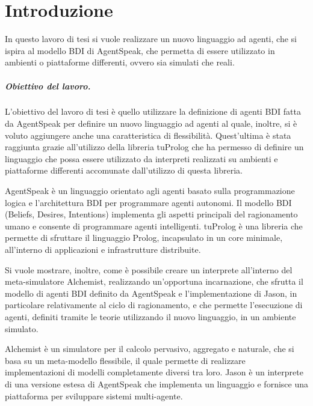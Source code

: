 \chapter{Introduzione}
\lhead[\fancyplain{}{\bfseries\thepage}]{\fancyplain{}{\bfseries\rightmark}}
In questo lavoro di tesi si vuole realizzare un nuovo linguaggio ad agenti, che si ispira al modello BDI di AgentSpeak, che permetta di essere utilizzato in ambienti o piattaforme differenti, ovvero sia simulati che reali.

\paragraph{Obiettivo del lavoro.}
L'obiettivo del lavoro di tesi è quello utilizzare la definizione di agenti BDI fatta da AgentSpeak per definire un nuovo linguaggio ad agenti al quale, inoltre, si è voluto aggiungere anche una caratteristica di flessibilità. Quest'ultima è stata raggiunta grazie all'utilizzo della libreria tuProlog che ha permesso di definire un linguaggio che possa essere utilizzato da interpreti realizzati su ambienti e piattaforme differenti accomunate dall'utilizzo di questa libreria.

AgentSpeak è un linguaggio orientato agli agenti basato sulla programmazione logica e l'architettura BDI per programmare agenti autonomi. Il modello BDI (Beliefs, Desires, Intentions) implementa gli aspetti principali del ragionamento umano e consente di programmare agenti intelligenti.
tuProlog è una libreria che permette di sfruttare il linguaggio Prolog, incapsulato in un core minimale, all'interno di applicazioni e infrastrutture distribuite.

Si vuole mostrare, inoltre, come è possibile creare un interprete all'interno del meta-simulatore Alchemist, realizzando un'opportuna incarnazione, che sfrutta il modello di agenti BDI definito da AgentSpeak e l'implementazione di Jason, in particolare relativamente al ciclo di ragionamento, e che permette l'esecuzione di agenti, definiti tramite le teorie utilizzando il nuovo linguaggio, in un ambiente simulato.

Alchemist è un simulatore per il calcolo pervasivo, aggregato e naturale, che si basa su un meta-modello flessibile, il quale permette di realizzare implementazioni di modelli completamente diversi tra loro.
Jason è un interprete di una versione estesa di AgentSpeak che implementa un linguaggio e fornisce una piattaforma per sviluppare sistemi multi-agente.

